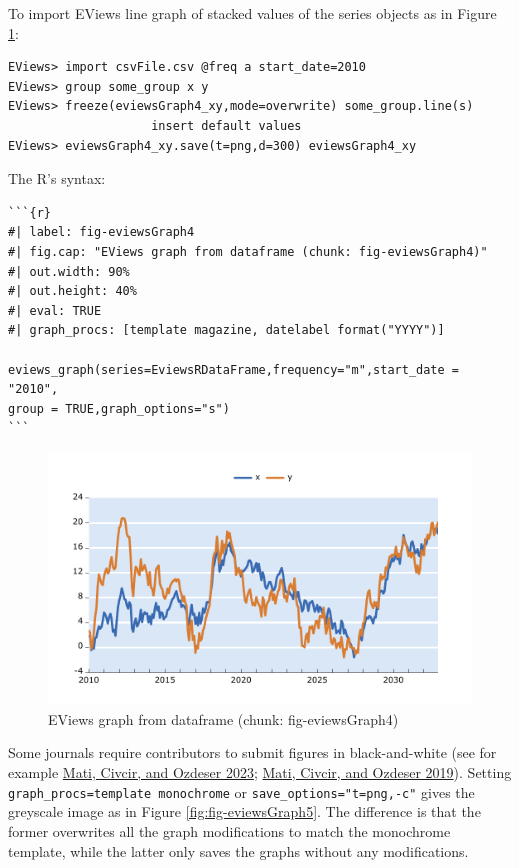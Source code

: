 To import EViews line graph of stacked values of the series objects as in Figure \ref{fig:fig-eviewsGraph4}:

\begin{verbatim}
EViews> import csvFile.csv @freq a start_date=2010
EViews> group some_group x y
EViews> freeze(eviewsGraph4_xy,mode=overwrite) some_group.line(s)
                    insert default values
EViews> eviewsGraph4_xy.save(t=png,d=300) eviewsGraph4_xy
\end{verbatim}

The R's syntax:

\begin{verbatim}
```{r} 
#| label: fig-eviewsGraph4
#| fig.cap: "EViews graph from dataframe (chunk: fig-eviewsGraph4)"
#| out.width: 90%
#| out.height: 40%
#| eval: TRUE
#| graph_procs: [template magazine, datelabel format("YYYY")]

eviews_graph(series=EviewsRDataFrame,frequency="m",start_date = "2010",
group = TRUE,graph_options="s")
```
\end{verbatim}

\begin{figure}

{\centering \includegraphics[width=0.9\linewidth,height=0.4\textheight]{figures/eviewsgraph4-eviewsgraph4-xy} 

}

\caption{EViews graph from dataframe (chunk: fig-eviewsGraph4)}\label{fig:fig-eviewsGraph4}
\end{figure}

Some journals require contributors to submit figures in black-and-white (see for example \protect\hyperlink{ref-Mati2023}{Mati, Civcir, and Ozdeser 2023}; \protect\hyperlink{ref-Mati2019c}{Mati, Civcir, and Ozdeser 2019}). Setting \texttt{graph\_procs=\textquotesingle{}template\ monochrome\textquotesingle{}} or \texttt{save\_options="t=png,-c"} gives the greyscale image as in Figure \ref{fig:fig-eviewsGraph5}. The difference is that the former overwrites all the graph modifications to match the monochrome template, while the latter only saves the graphs without any modifications.

